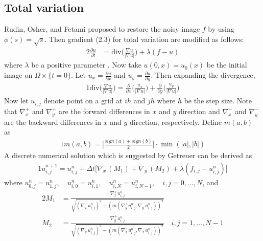 \documentclass[12pt]{report}
\begin{document}
\begin{tableofcontents}
        	\section{Total variation}
Rudin, Osher, and Fetami proposed to restore the noisy image $f$ by using $\phi(s)=\sqrt{s}$. Then gradient (2.3) for total variation are modified as follows:
				\begin{alignat*}{2}
	\displaystyle\frac{\partial u}{\partial t}
    		&= \text{div}\Big(\frac{\nabla u}{|\nabla u|}\Big) + \lambda(f-u)
        		\end{alignat*}
where $\lambda$ be a positive parameter \cite{getreuer2012rudin, rudin1992nonlinear}.
Now take $u(0,x) = u_{0}(x)$ be the initial image on $\Omega\times\{t=0\}$. Let $u_{x}=\frac{\partial u}{\partial x}$ and $u_{y}=\frac{\partial u}{\partial y}$. Then expanding the divergence,
				\begin{alignat*}{1}
\text{div}\Big(\frac{\nabla u}{|\nabla u|}\Big) =
		  \frac{\partial}{\partial x}\Big(\frac{u_{x}}{|\nabla u|}\Big)
        + \frac{\partial}{\partial y}\Big(\frac{u_{y}}{|\nabla u|}\Big)
                \end{alignat*}
Now let $u_{i,j}$ denote point on a grid at $ih$ and $jh$ where $h$ be the step size. Note that $\nabla_{x}^{+}$ and $\nabla_{y}^{+}$ are the forward differences in $x$ and $y$ direction and $\nabla_{x}^{-}$ and $\nabla_{y}^{-}$ are the backward differences in $x$ and $y$ direction, respectively. Define $m(a, b)$ as
				\begin{alignat*}{1}
                	m(a, b) = \Big[\frac{sign(a)+sign(b)}{2}\Big]\cdot\min(|a|,|b|)
			    \end{alignat*}
A discrete numerical solution which is suggested by Getreuer \cite{getreuer2012rudin} can be derived as
				\begin{alignat*}{1}
				u_{i,j}^{n+1}= u_{i,j}^{n} + \Delta t\Big[\nabla_{x}^{-}(M_{1})
                +\nabla_{y}^{-}(M_{2}) + \lambda(f_{i,j}-u_{i,j}^{n})\Big]
                \end{alignat*}
where \quad $u_{0,j}^{n} = u_{1,j}^{n},\quad u_{i,0}^{n} = u_{i,1}^{n},\quad u_{i,N}^{n} = u_{i,N-1}^{n}, \quad i,j = 0,\ldots,N$, and
				\begin{alignat*}{2}
\displaystyle M_{1}&= \frac{\nabla_{x}^{+}u_{i,j}^{n}}{\sqrt{(\nabla_{x}^{+}u_{i,j}^{n})^2 + (m(\nabla_{y}^{+}u_{i,j}^{n}, \nabla_{y}^{-}u_{i,j}^{n}))^2}} \\
\displaystyle M_{2}&= \frac{\nabla_{y}^{+}u_{i,j}^{n}}{\sqrt{(\nabla_{y}^{+}u_{i,j}^{n})^2 + (m(\nabla_{x}^{+}u_{i,j}^{n}, \nabla_{x}^{-}u_{i,j}^{n}))^2}}\quad i,j = 1,\ldots,N-1\\
                \end{alignat*}

\end{tableofcontents}
\end{document}
